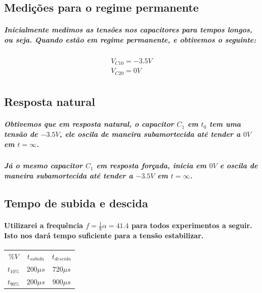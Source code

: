 \documentclass[12pt,twoside, a4paper, twocolumn]{article}
\begin{document}
{\subsection{Medições para o regime permanente}

\subparagraph*{Inicialmente medimos as tensões nos capacitores para tempos longos, ou seja. Quando estão em regime permanente, e obtivemos o seguinte:}

\begin{equation*}
    \begin{aligned}
        V_{C10} = -3.5V \\
        V_{C20} = 0V    \\
    \end{aligned}
\end{equation*}

\subsection{Resposta natural}

\subparagraph*{Obtivemos que em resposta natural, o capacitor $C_1$ em $t_0$ tem uma tensão de $-3.5V$, ele oscila de maneira subamortecida até tender a $0V$ em $t = \infty$.}

\subparagraph*{Já o mesmo capacitor $C_1$ em resposta forçada, inicia em $0V$ e oscila de maneira subamortecida até tender a $-3.5V$ em $t = \infty$.}

\subsection{Tempo de subida e descida}

\paragraph*{Utilizarei a frequência $f = \frac{1}{8} \alpha = 41.4$ para todos experimentos a seguir. Isto nos dará tempo suficiente para a tensão estabilizar.}

\begin{center}
    \begin{tabular}{ |ccc| }
        \hline
        $\%V$      & $t_{subida}$ & $t_{descida}$ \\
        $t_{10\%}$ & $200\mu s$   & $720 \mu s$   \\
        $t_{90\%}$ & $200\mu s$   & $900 \mu s$   \\
        \hline
    \end{tabular}
\end{center}

}
\end{document}
